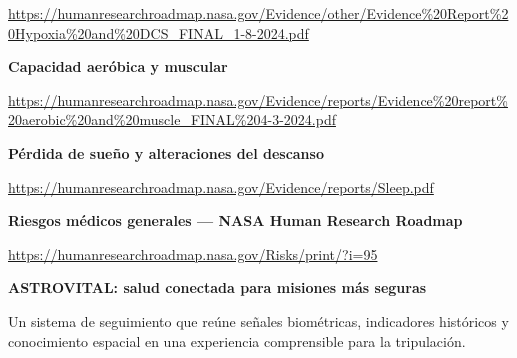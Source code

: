 \documentclass[10pt,a4paper]{article}
\begin{document}
{\footnotesize\url{https://humanresearchroadmap.nasa.gov/Evidence/other/Evidence%20Report%20Hypoxia%20and%20DCS_FINAL_1-8-2024.pdf}}\par\vspace{6pt}
{\small\bfseries\color{navy}Capacidad aeróbica y muscular}\par
{\footnotesize\url{https://humanresearchroadmap.nasa.gov/Evidence/reports/Evidence%20report%20aerobic%20and%20muscle_FINAL%204-3-2024.pdf}}\par\vspace{6pt}
{\small\bfseries\color{navy}Pérdida de sueño y alteraciones del descanso}\par
{\footnotesize\url{https://humanresearchroadmap.nasa.gov/Evidence/reports/Sleep.pdf}}\par\vspace{6pt}
{\small\bfseries\color{navy}Riesgos médicos generales — NASA Human Research Roadmap}\par
{\footnotesize\url{https://humanresearchroadmap.nasa.gov/Risks/print/?i=95}}\par
\vfill
\begin{navybox}
{\color{white}\bfseries ASTROVITAL: salud conectada para misiones más seguras}\par
{\color{white}Un sistema de seguimiento que reúne señales biométricas, indicadores históricos y conocimiento espacial en una experiencia comprensible para la tripulación.}
\end{navybox}
\end{document}
